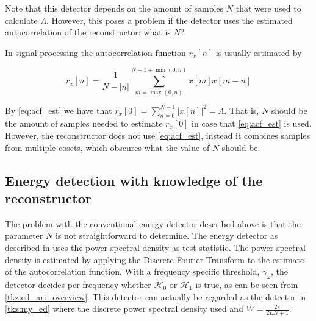 \documentclass[a4paper, openany, oneside]{memoir}
\begin{document}
Note that this detector depends on the amount of samples $N$ that were used to calculate $\Lambda$. However, this poses a problem if the detector uses the estimated autocorrelation of the reconstructor: what is $N$?

In signal processing the autocorrelation function $r_x[n]$ is usually estimated by 

\begin{equation}\label{eq:acf_est}
r_x[n] = \frac{1}{N-|n|}\sum_{m=\max(0,n)}^{N-1+\min(0,n)} x[m]\overline{x}[m-n]
\end{equation}

By \cref{eq:acf_est} we have that $r_x[0] = \sum_{n=0}^{N-1} |x[n]|^2 = \Lambda$. That is, $N$ should be the amount of samples needed to estimate $r_x[0]$ in case that \cref{eq:acf_est} is used. However, the reconstructor does not use \cref{eq:acf_est}, instead it combines samples from multiple cosets, which obscures what the value of $N$ should be. 

\subsection{Energy detection with knowledge of the reconstructor}
The problem with the conventional energy detector described above is that the parameter $N$ is not straightforward to determine. The energy detector as described in \cite{ariananda2012compressive} uses the power spectral density as test statistic. The power spectral density is estimated by applying the Discrete Fourier Transform to the estimate of the autocorrelation function. With a frequency specific threshold, $\gamma_{\omega}$, the detector decides per frequency whether $\mathcal{H}_0$ or $\mathcal{H}_1$ is true, as can be seen from \cref{tkz:ed_ari_overview}. This detector can actually be regarded as the detector in \cref{tkz:my_ed} where the discrete power spectral density used and $W=\frac{2\pi}{2LN+1}$.  
\end{document}
